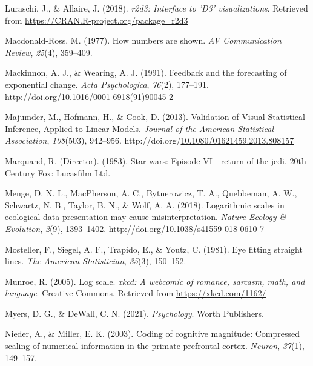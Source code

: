\documentclass[print]{nuthesis}
\newlength{\cslhangindent}
\newenvironment{CSLReferences}%
{\setlength{\parindent}{0pt}%
\everypar{\setlength{\hangindent}{\cslhangindent}}\ignorespaces}%
{\par}
\begin{document}
\begin{CSLReferences}{1}{0}
\leavevmode{}%
Luraschi, J., \& Allaire, J. (2018). \emph{r2d3: Interface to 'D3' visualizations}. Retrieved from \url{https://CRAN.R-project.org/package=r2d3}

\leavevmode{}%
Macdonald-Ross, M. (1977). How numbers are shown. \emph{AV Communication Review}, \emph{25}(4), 359--409.

\leavevmode{}%
Mackinnon, A. J., \& Wearing, A. J. (1991). Feedback and the forecasting of exponential change. \emph{Acta Psychologica}, \emph{76}(2), 177--191. http://doi.org/\href{https://doi.org/10.1016/0001-6918(91)90045-2}{10.1016/0001-6918(91)90045-2}

\leavevmode{}%
Majumder, M., Hofmann, H., \& Cook, D. (2013). Validation of {Visual} {Statistical} {Inference}, {Applied} to {Linear} {Models}. \emph{Journal of the American Statistical Association}, \emph{108}(503), 942--956. http://doi.org/\href{https://doi.org/10.1080/01621459.2013.808157}{10.1080/01621459.2013.808157}

\leavevmode{}%
Marquand, R. (Director). (1983). Star wars: Episode VI - return of the jedi. 20th Century Fox: Lucasfilm Ltd.

\leavevmode{}%
Menge, D. N. L., MacPherson, A. C., Bytnerowicz, T. A., Quebbeman, A. W., Schwartz, N. B., Taylor, B. N., \& Wolf, A. A. (2018). Logarithmic scales in ecological data presentation may cause misinterpretation. \emph{Nature Ecology \& Evolution}, \emph{2}(9), 1393--1402. http://doi.org/\href{https://doi.org/10.1038/s41559-018-0610-7}{10.1038/s41559-018-0610-7}

\leavevmode{}%
Mosteller, F., Siegel, A. F., Trapido, E., \& Youtz, C. (1981). Eye fitting straight lines. \emph{The American Statistician}, \emph{35}(3), 150--152.

\leavevmode{}%
Munroe, R. (2005). Log scale. \emph{xkcd: A webcomic of romance, sarcasm, math, and language}. Creative Commons. Retrieved from \url{https://xkcd.com/1162/}

\leavevmode{}%
Myers, D. G., \& DeWall, C. N. (2021). \emph{Psychology}. Worth Publishers.

\leavevmode{}%
Nieder, A., \& Miller, E. K. (2003). Coding of cognitive magnitude: Compressed scaling of numerical information in the primate prefrontal cortex. \emph{Neuron}, \emph{37}(1), 149--157.


\end{CSLReferences}
\end{document}
